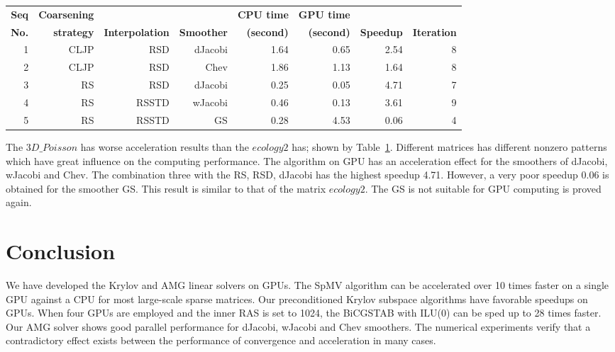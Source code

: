 \documentclass[runningheads,a4paper]{llncs}
\begin{document}
{\begin{table}
\begin{tabular}{|r|r|r|r|r|r|r|r|}
\bfseries Seq & \bfseries Coarsening & \bfseries               & \bfseries          & \bfseries CPU time & \bfseries GPU time & \bfseries         & \bfseries           \\
\bfseries No. & \bfseries strategy   & \bfseries Interpolation & \bfseries Smoother & \bfseries (second) & \bfseries (second) & \bfseries Speedup & \bfseries Iteration \\ \hline
1	          &CLJP	   &RSD	        &dJacobi	    &1.64	       &0.65	       &2.54	       &8\\ \hline
2	          &CLJP	   &RSD	        &Chev	        &1.86	       &1.13	       &1.64	       &8\\ \hline
3	          &RS	   &RSD	        &dJacobi	    &0.25	       &0.05	       &4.71	       &7\\ \hline
4	          &RS	   &RSSTD	    &wJacobi	    &0.46	       &0.13	       &3.61	       &9\\ \hline
5	          &RS	   &RSSTD	    &GS	            &0.28	       &4.53	       &0.06	       &4\\ \hline
\end{tabular}
\label{tbl_amg_3dpoisson}
\end{table}

The $3D\_Poisson$ has worse acceleration results than the $ecology2$ has; shown by Table~\ref{tbl_amg_3dpoisson}. Different matrices has different nonzero patterns which have great influence on the computing performance. The algorithm on GPU has an acceleration effect for the smoothers of dJacobi, wJacobi and Chev. The combination three with the RS, RSD, dJacobi has the highest speedup 4.71. However, a very poor speedup 0.06 is obtained for the smoother GS. This result is similar to that of the matrix $ecology2$. The GS is not suitable for GPU computing is proved again.

\section{Conclusion}
\label{sec_conclusion}

We have developed the Krylov and AMG linear solvers on GPUs. The SpMV algorithm can be accelerated over 10 times faster on a single GPU against a CPU for most large-scale sparse matrices. Our preconditioned Krylov subspace algorithms have favorable speedups on GPUs. When four GPUs are employed and the inner RAS is set to 1024, the BiCGSTAB with ILU(0) can be sped up to 28 times faster. Our AMG solver shows good parallel performance for dJacobi, wJacobi and Chev smoothers. The numerical experiments verify that a contradictory effect exists between the performance of convergence and acceleration in many cases.

}
\end{document}
